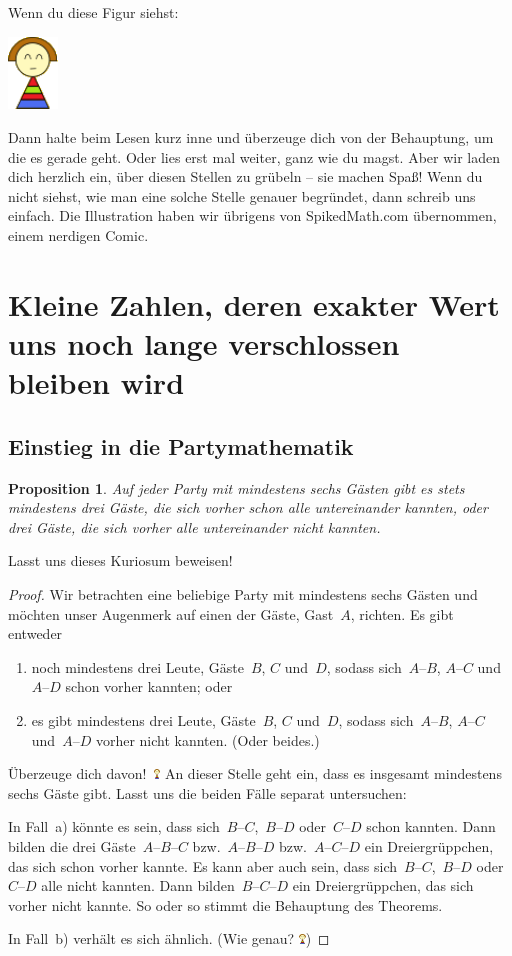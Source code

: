 \documentclass{../../zirkelblatt1718}
\theoremstyle{definition}
\theoremstyle{plain}
\newtheorem{prop}[defn]{Proposition}
\theoremstyle{remark}
\newcommand{\happy}{\includegraphics[height=0.7em]{happy}\xspace}
\begin{document}
Wenn du diese Figur siehst:
\begin{center}\includegraphics[width=0.1\textwidth]{happy}\end{center}
Dann halte beim Lesen kurz inne und überzeuge dich von der Behauptung, um die
es gerade geht. Oder lies erst mal weiter, ganz wie du magst. Aber wir laden
dich herzlich ein, über diesen Stellen zu grübeln -- sie machen Spaß! Wenn du
nicht siehst, wie man eine solche Stelle genauer begründet, dann schreib uns
einfach. Die Illustration haben wir übrigens von SpikedMath.com übernommen,
einem nerdigen Comic.


\section{Kleine Zahlen, deren exakter Wert uns noch lange verschlossen bleiben wird}

\subsection{Einstieg in die Partymathematik}

\begin{prop}
Auf jeder Party mit mindestens sechs Gästen gibt es stets mindestens drei
Gäste, die sich vorher schon alle untereinander kannten, oder drei Gäste, die
sich vorher alle untereinander nicht kannten.
\end{prop}

Lasst uns dieses Kuriosum beweisen!

\begin{proof}Wir betrachten eine beliebige Party mit mindestens sechs Gästen
und möchten unser Augenmerk auf einen der Gäste, Gast~$A$, richten. Es gibt
entweder
\begin{enumerate}
\item noch mindestens drei Leute, Gäste~$B$, $C$ und~$D$, sodass sich~$A$--$B$,
$A$--$C$ und~$A$--$D$ schon vorher kannten; oder
\item es gibt mindestens drei Leute, Gäste~$B$, $C$ und~$D$, sodass
sich~$A$--$B$, $A$--$C$ und~$A$--$D$ vorher nicht kannten. (Oder beides.)
\end{enumerate}
Überzeuge dich davon!~\happy An dieser Stelle geht ein, dass es insgesamt mindestens
sechs Gäste gibt. Lasst uns die beiden Fälle separat untersuchen:

In Fall~a) könnte es sein, dass sich~$B$--$C$,~$B$--$D$ oder~$C$--$D$ schon kannten.
Dann bilden die drei Gäste~$A$--$B$--$C$ bzw.~$A$--$B$--$D$ bzw.~$A$--$C$--$D$
ein Dreiergrüppchen, das sich schon vorher kannte. Es kann aber auch sein, dass
sich~$B$--$C$,~$B$--$D$ oder~$C$--$D$ alle nicht kannten. Dann
bilden~$B$--$C$--$D$ ein Dreiergrüppchen, das sich vorher nicht kannte. So oder
so stimmt die Behauptung des Theorems.

In Fall~b) verhält es sich ähnlich. (Wie genau? \happy)
\end{proof}
\end{document}
